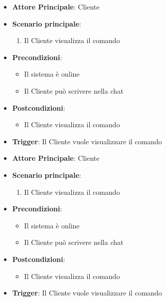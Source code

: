 \label{uc_43.1.2}
\begin{itemize}
    \item \textbf{Attore Principale}: Cliente
	\item \textbf{Scenario principale}:
	\begin{enumerate}
		\item Il Cliente visualizza il comando 
	\end{enumerate}
	\item \textbf{Precondizioni}:
	\begin{itemize}
		\item Il sistema è online 
		\item Il Cliente può scrivere nella chat
	\end{itemize}
	\item \textbf{Postcondizioni}:
	\begin{itemize}
		\item Il Cliente visualizza il comando 
	\end{itemize}
	\item \textbf{Trigger}: Il Cliente vuole visualizzare il comando 
\end{itemize}

\label{uc_43.1.3}
\begin{itemize}
    \item \textbf{Attore Principale}: Cliente
	\item \textbf{Scenario principale}:
	\begin{enumerate}
		\item Il Cliente visualizza il comando 
	\end{enumerate}
	\item \textbf{Precondizioni}:
	\begin{itemize}
		\item Il sistema è online 
		\item Il Cliente può scrivere nella chat
	\end{itemize}
	\item \textbf{Postcondizioni}:
	\begin{itemize}
		\item Il Cliente visualizza il comando 
	\end{itemize}
	\item \textbf{Trigger}: Il Cliente vuole visualizzare il comando 
\end{itemize}

